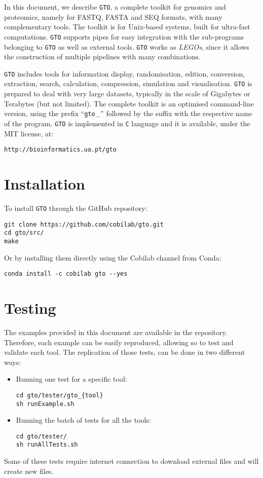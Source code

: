 In this document, we describe \texttt{GTO}, a complete toolkit for genomics and proteomics, namely for FASTQ, FASTA and SEQ formats, with many complementary tools. The toolkit is for Unix-based systems, built for ultra-fast computations. \texttt{GTO} supports pipes for easy integration with the sub-programs belonging to \texttt{GTO} as well as external tools. \texttt{GTO} works as \textit{LEGOs}, since it allows the construction of multiple pipelines with many combinations.

\texttt{GTO} includes tools for information display, randomisation, edition, conversion, extraction, search, calculation, compression, simulation and visualisation. \texttt{GTO} is prepared to deal with very large datasets, typically in the scale of Gigabytes or Terabytes (but not limited).
The complete toolkit is an optimised command-line version, using the prefix ``\texttt{gto}\_'' followed by the suffix with the respective name of the program. \texttt{GTO} is implemented in \texttt{C} language and it is available, under the MIT license, at:
\begin{lstlisting}
http://bioinformatics.ua.pt/gto
\end{lstlisting}

\section{Installation}
To install \texttt{GTO} through the GitHub repository:
\begin{lstlisting}
git clone https://github.com/cobilab/gto.git
cd gto/src/
make
\end{lstlisting}
Or by installing them directly using the Cobilab channel from Conda:
\begin{lstlisting}
conda install -c cobilab gto --yes
\end{lstlisting}


\section{Testing}
The examples provided in this document are available in the repository. Therefore, each example can be easily reproduced, allowing so to test and validate each tool. The replication of those tests, can be done in two different ways: 
\begin{itemize}
	\item Running one test for a specific tool:
\begin{lstlisting}
cd gto/tester/gto_{tool}
sh runExample.sh
\end{lstlisting}
\item Running the batch of tests for all the tools:
\begin{lstlisting}
cd gto/tester/
sh runAllTests.sh
\end{lstlisting}
\end{itemize}
Some of these tests require internet connection to download external files and will create new files.

